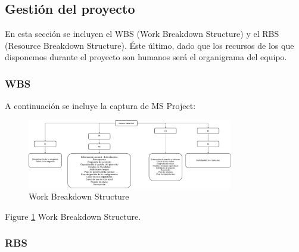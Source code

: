 \subsection{Gestión del proyecto}
\par En esta sección se incluyen el WBS (Work Breakdown Structure) y el RBS (Resource Breakdown Structure). Éste último, dado que los recursos de los que disponemos durante el proyecto son humanos será el organigrama del equipo.

\subsubsection{WBS}
\par A continuación se incluye la captura de MS Project:
\begin{figure}
  \centering
    \includegraphics[width=0.8\textwidth]{img/WBS.jpeg}
  \caption{Work Breakdown Structure}
  \label{fig:wbs}
\end{figure}
Figure \ref{fig:wbs} Work Breakdown Structure.


\subsubsection{RBS}
